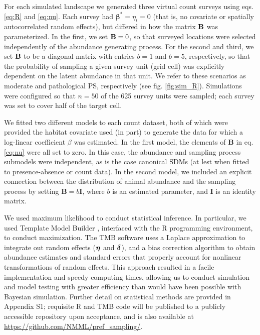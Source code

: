 \documentclass[times,mee,doublespace,]{besauth2}
\begin{document}
For each simulated landscape we generated three virtual count surveys using eqs. \ref{eq:R} and \ref{eq:nu}.  Each survey had $\boldsymbol{\beta}^*=\eta_i=0$ (that is, no covariate or spatially autocorrelated random effects), but differed in how the matrix ${\bf B}$ was parameterized.  In the first, we set ${\bf B}=0$, so that surveyed locations were selected independently of the abundance generating process.  For the second and third, we set ${\bf B}$ to be a diagonal matrix with entries $b=1$ and $b=5$, respectively, so that the probability of sampling a given survey unit (grid cell) was explicitly dependent on the latent abundance in that unit.  We refer to these scenarios as moderate and pathological PS, respectively (see fig. \ref{fig:sim_R}).  Simulations were configured so that $n=50$ of the 625 survey units were sampled; each survey was set to cover half of the target cell.

We fitted two different models to each count dataset, both of which were provided the habitat covariate used (in part) to generate the data for which a log-linear coefficient $\beta$ was estimated.  In the first model, the elements of \textbf{B} in eq. \ref{eq:nu} were all set to zero.  In this case, the abundance and sampling process submodels were independent, as is the case canonical SDMs (at lest when fitted to presence-absence or count data).  In the second model, we included an explicit connection between the distribution of animal abundance and the sampling process by setting $\textbf{B}=b\textbf{I}$, where $b$ is an estimated parameter, and \textbf{I} is an identity matrix.

We used maximum likelihood to conduct statistical inference. In particular, we used Template Model Builder \citep[TMB; ][]{KristensenEtAl2015}, interfaced with the R programming environment, to conduct maximization. The TMB software uses a Laplace approximation to integrate out random effects ($\boldsymbol{\eta}$ and $\boldsymbol{\delta}$), and a bias correction algorithm \citep{TierneyEtAl1989,ThorsonKristensenInPress} to obtain abundance estimates and standard errors that properly account for nonlinear transformations of random effects.  This approach resulted in a facile implementation and speedy computing times, allowing us to conduct simulation and model testing with greater efficiency than would have been possible with Bayesian simulation.  Further detail on statistical methods are provided in Appendix S1; requisite R and TMB code will be published to a publicly accessible repository upon acceptance, and is also available at \url{https://github.com/NMML/pref_sampling/}.
\end{document}
